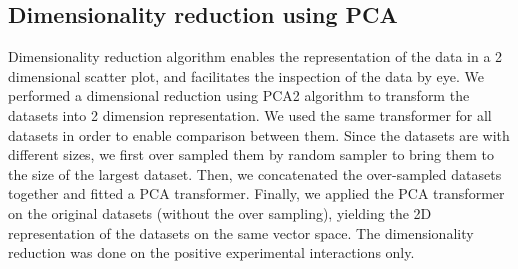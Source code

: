 \documentclass{bmcart}
\begin{document}
\subsection*{Dimensionality reduction using PCA}
Dimensionality reduction algorithm enables the representation of the data in a 2 dimensional scatter plot, and facilitates the inspection of the data by eye. We performed a dimensional reduction using PCA2 algorithm to transform the datasets into 2 dimension representation. 
We used the same transformer for all datasets in order to enable comparison between them. 
Since the datasets are with different sizes, we first over sampled them by random sampler to bring them to the size of the largest dataset. Then, we concatenated the over-sampled datasets together and fitted a PCA transformer. Finally, we applied the PCA transformer on the original datasets (without the over sampling), yielding the 2D representation of the datasets on the same vector space. 
The dimensionality reduction was done on the positive experimental interactions only.


\end{document}

